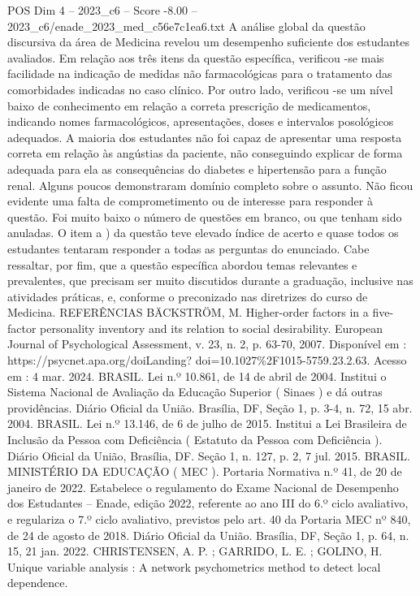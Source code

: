 \begin{textsample}{POS Dim 4 – 2023\_c6 – Score -8.00 – 2023\_c6/enade\_2023\_med\_c56e7c1ea6.txt}
A análise global da questão discursiva da área de Medicina revelou um desempenho suficiente dos estudantes avaliados.
Em relação aos três itens da questão específica, verificou -se mais facilidade na indicação de medidas não farmacológicas para o tratamento das comorbidades indicadas no caso clínico.
Por outro lado, verificou -se um nível baixo de conhecimento em relação a correta prescrição de medicamentos, indicando nomes farmacológicos, apresentações, doses e intervalos posológicos adequados.
A maioria dos estudantes não foi capaz de apresentar uma resposta correta em relação às angústias da paciente, não conseguindo explicar de forma adequada para ela as consequências do diabetes e hipertensão para a função renal.
Alguns poucos demonstraram domínio completo sobre o assunto.
Não ficou evidente uma falta de comprometimento ou de interesse para responder à questão.
Foi muito baixo o número de questões em branco, ou que tenham sido anuladas.
O item a ) da questão teve elevado índice de acerto e quase todos os estudantes tentaram responder a todas as perguntas do enunciado.
Cabe ressaltar, por fim, que a questão específica abordou temas relevantes e prevalentes, que precisam ser muito discutidos durante a graduação, inclusive nas atividades práticas, e, conforme o preconizado nas diretrizes do curso de Medicina.
REFERÊNCIAS BÄCKSTRÖM, M.
Higher-order factors in a five-factor personality inventory and its relation to social desirability.
European Journal of Psychological Assessment, v. 23, n. 2, p. 63-70, 2007.
Disponível em : https://psycnet.apa.org/doiLanding? doi=10.1027\%2F1015-5759.23.2.63.
Acesso em : 4 mar. 2024.
BRASIL.
Lei n.º 10.861, de 14 de abril de 2004.
Institui o Sistema Nacional de Avaliação da Educação Superior ( Sinaes ) e dá outras providências.
Diário Oficial da União.
Brasília, DF, Seção 1, p. 3-4, n. 72, 15 abr. 2004.
BRASIL.
Lei n.º 13.146, de 6 de julho de 2015.
Institui a Lei Brasileira de Inclusão da Pessoa com Deficiência ( Estatuto da Pessoa com Deficiência ).
Diário Oficial da União, Brasília, DF.
Seção 1, n. 127, p. 2, 7 jul. 2015.
BRASIL.
MINISTÉRIO DA EDUCAÇÃO ( MEC ).
Portaria Normativa n.º 41, de 20 de janeiro de 2022.
Estabelece o regulamento do Exame Nacional de Desempenho dos Estudantes – Enade, edição 2022, referente ao ano III do 6.º ciclo avaliativo, e regulariza o 7.º ciclo avaliativo, previstos pelo art. 40 da Portaria MEC nº 840, de 24 de agosto de 2018.
Diário Oficial da União.
Brasília, DF, Seção 1, p. 64, n. 15, 21 jan. 2022.
CHRISTENSEN, A.
P. ; GARRIDO, L.
E. ; GOLINO, H.
Unique variable analysis : A network psychometrics method to detect local dependence.

\end{textsample}
